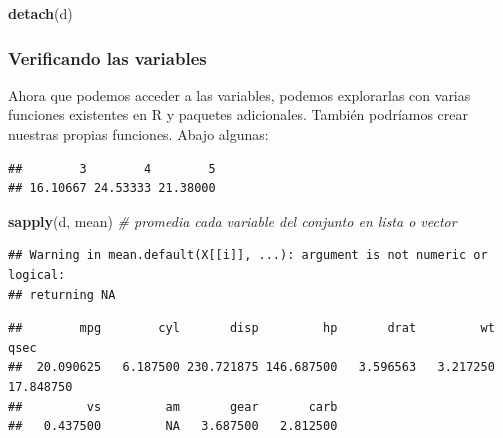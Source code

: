 \documentclass[
]{article}
\newenvironment{Shaded}{\begin{snugshade}}{\end{snugshade}}
\newcommand{\CommentTok}[1]{\textcolor[rgb]{0.56,0.35,0.01}{\textit{#1}}}
\newcommand{\FunctionTok}[1]{\textcolor[rgb]{0.13,0.29,0.53}{\textbf{#1}}}
\newcommand{\NormalTok}[1]{#1}
\newcommand{\SpecialCharTok}[1]{\textcolor[rgb]{0.81,0.36,0.00}{\textbf{#1}}}
\begin{document}
\begin{Shaded}
\begin{Highlighting}[]
\FunctionTok{detach}\NormalTok{(d)}
\end{Highlighting}
\end{Shaded}

\subsubsection{Verificando las
variables}\label{verificando-las-variables}

Ahora que podemos acceder a las variables, podemos explorarlas con
varias funciones existentes en R y paquetes adicionales. También
podríamos crear nuestras propias funciones. Abajo algunas:

\begin{Shaded}
\end{Shaded}

\begin{verbatim}
##        3        4        5 
## 16.10667 24.53333 21.38000
\end{verbatim}

\begin{Shaded}
\begin{Highlighting}[]
\FunctionTok{sapply}\NormalTok{(d, mean) }\CommentTok{\# promedia cada variable del conjunto en lista o vector}
\end{Highlighting}
\end{Shaded}

\begin{verbatim}
## Warning in mean.default(X[[i]], ...): argument is not numeric or logical:
## returning NA
\end{verbatim}

\begin{verbatim}
##        mpg        cyl       disp         hp       drat         wt       qsec 
##  20.090625   6.187500 230.721875 146.687500   3.596563   3.217250  17.848750 
##         vs         am       gear       carb 
##   0.437500         NA   3.687500   2.812500
\end{verbatim}

\begin{Shaded}
\end{Shaded}
\end{document}
